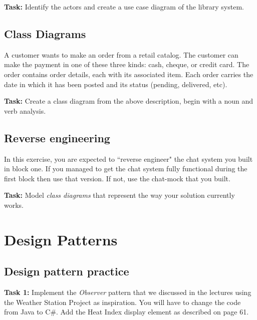 \documentclass{article}
\begin{document}
\vspace{0.3cm}

  \noindent \textbf{Task:} Identify the actors and create a use case diagram of the library system.

  \subsection{Class Diagrams}

  A customer wants to make an order from a retail catalog. The customer can make the payment in one of these three kinds: cash, cheque, or credit card. The order contains order details, each with its associated item. Each order carries the date in which it has been posted and its status (pending, delivered, etc).

\vspace{0.3cm}

  \noindent \textbf{Task:} Create a class diagram from the above description, begin with a noun and verb analysis.

  \subsection{ Reverse engineering }
    In this exercise, you are expected to ``reverse engineer" the chat system you built in block one. If you managed to get the chat system fully functional during the first block then use that version. If not, use the chat-mock that you built.

 \vspace{0.3cm}

  \noindent   \textbf{Task:} Model \emph{class diagrams} that represent the way your solution currently works.



\section{Design Patterns}

  \subsection{Design pattern practice}
  
    
\vspace{0.3cm}

  \noindent \textbf{Task 1:} Implement the \emph{Observer} pattern that we discussed in the lectures using the 
    Weather Station Project as inspiration. You will have to change the code from Java to C\#. 
    Add the Heat Index display element as described on page 61.
 \vspace{0.3cm}
\end{document}
